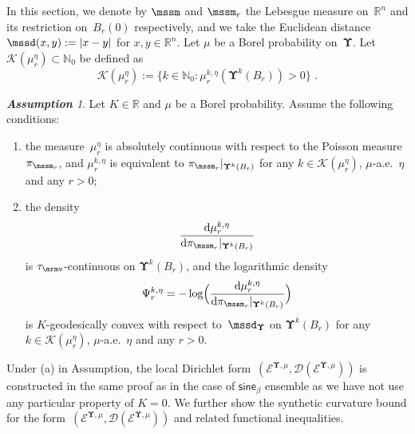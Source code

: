 \documentclass[11pt,letterpaper]{amsart}
\newcommand{\dom}[1]{\mathcal D(#1)}
\newcommand{\diff}{\mathop{}\!\mathrm{d}}
\newcommand{\N}{{\mathbb N}}
\newcommand{\R}{{\mathbb R}}
\newcommand{\fstop}{\,\,\mathrm{.}}
\newcommand{\QP}{{\mu}}
\newcommand{\dUpsilon}{{\mathbf \Upsilon}}
\newcommand{\U}{\dUpsilon}
\newcommand{\sine}{\mathsf{sine}}
\newcommand{\E}{\mathcal E}
\renewcommand{\1}{\mathbf 1}
\numberwithin{equation}{section}
\theoremstyle{plain}
\theoremstyle{definition}
\theoremstyle{remark}
\newtheorem{ass}[thm]{\bf Assumption}%
\begin{document}
In this section, we denote by $\mssm$ and $\mssm_r$ the Lebesgue measure on~$\R^n$ and its restriction on~$B_r(0)$ respectively, and we take the Euclidean distance~$\mssd(x, y):=|x-y|$ for $x, y \in \R^n$. 
Let $\mu$ be a Borel probability on~$\U$. Let $\mathcal K(\mu^\eta_r) \subset \N_0$ be defined as
$$\mathcal K(\mu^\eta_r):=\{k \in \N_0: \mu_r^{k, \eta}(\U^k(B_r))>0\} \fstop$$  
\begin{ass}\label{a:GT}
Let $K \in \R$ and $\mu$ be a Borel probability. Assume the following conditions:
\begin{enumerate}[$(a)$]
\item the measure~$\mu_r^\eta$ is absolutely continuous with respect to the Poisson measure~$\pi_{\mssm_r}$, and $\mu_r^{k, \eta}$ is equivalent to $\pi_{\mssm_r}|_{\U^k(B_r)}$ for any $k \in \mathcal K(\mu^\eta_r)$, $\QP$-a.e.~$\eta$ and any $r>0$;
\item the density~$$\frac{\diff\mu_r^{k, \eta}}{\diff \pi_{\mssm_r}|_{\U^k(B_r)}}$$ is $\tau_\mrmv$-continuous on $\U^k(B_r)$, and  the logarithmic density 
$$\Psi_r^{k, \eta}=-\log\Bigl(\frac{\diff\mu_r^{k, \eta}}{\diff \pi_{\mssm_r} |_{\U^k(B_r)}}\Bigr)$$ is $K$-geodesically convex with respect to~$\mssd_{\U}$ on $\U^k(B_r)$ for any $k \in \mathcal K(\mu^\eta_r)$, $\QP$-a.e.~$\eta$ and any $r>0$.%
\end{enumerate}
\end{ass}
Under (a) in Assumption, the local Dirichlet form~$(\E^{\U, \QP}, \dom{\E^{\U, \QP}})$ is constructed in the same proof as in the case of $\sine_\beta$ ensemble as we have not use any particular property of $K=0$. We further show the synthetic curvature bound for the form~$(\E^{\U, \QP}, \dom{\E^{\U, \QP}})$ and related functional inequalities.
\end{document}
